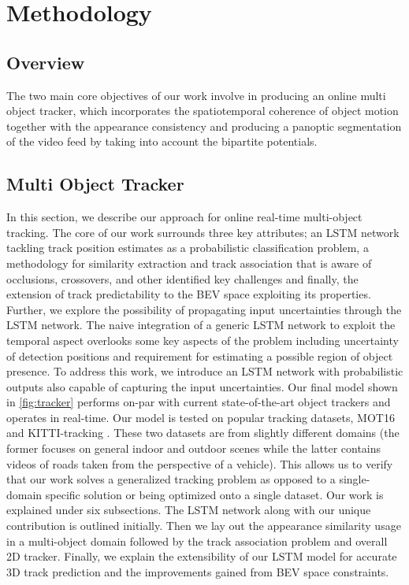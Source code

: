 \chapter{Methodology}

\section{Overview}
The two main core objectives of our work involve in producing an online multi object tracker, which incorporates the spatiotemporal coherence of object motion together with the appearance consistency and producing a panoptic segmentation of the video feed by taking into account the bipartite potentials.

\section{Multi Object Tracker}

In this section, we describe our approach for online real-time multi-object tracking. The core of our work surrounds three key attributes; an LSTM network tackling track position estimates as a probabilistic classification problem, a methodology for similarity extraction and track association that is aware of occlusions, crossovers, and other identified key challenges and finally, the extension of track predictability to the BEV space exploiting its properties. Further, we explore the possibility of propagating input uncertainties through the LSTM network. The naive integration of a generic LSTM network to exploit the temporal aspect overlooks some key aspects of the problem including uncertainty of detection positions and requirement for estimating a possible region of object presence. To address this work, we introduce an LSTM network with probabilistic outputs also capable of capturing the input uncertainties. Our final model shown in \ref{fig:tracker} performs on-par with current state-of-the-art object trackers and operates in real-time. Our model is tested on popular tracking datasets, MOT16 \cite{DeepSiam:MilanL0RS16} and KITTI-tracking \cite{DeepSiam:KITTI}. These two datasets are from slightly different domains (the former focuses on general indoor and outdoor scenes while the latter contains videos of roads taken from the perspective of a vehicle). This allows us to verify that our work solves a generalized tracking problem as opposed to a single-domain specific solution or being optimized onto a single dataset. Our work is explained under six subsections. The LSTM network along with our unique contribution is outlined initially. Then we lay out the appearance similarity usage in a multi-object domain followed by the track association problem and overall 2D tracker. Finally, we explain the extensibility of our LSTM model for accurate 3D track prediction and the improvements gained from BEV space constraints.


